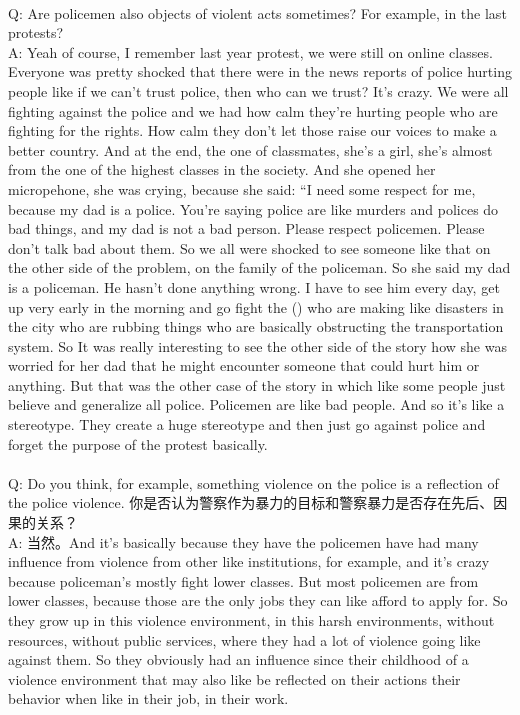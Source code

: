 \documentclass{phyasgn}\usepackage{nag}
\begin{document}
\\
Q: Are policemen also objects of violent acts sometimes? For example, in the last protests?\\
A: Yeah of course, I remember last year protest, we were still on online classes. Everyone was pretty shocked that there were in the news reports of police hurting people like if we can't trust police, then who can we trust? It's crazy. We were all fighting against the police and we had how calm they're hurting people who are fighting for the rights. How calm they don't let those raise our voices to make a better country. And at the end, the one of classmates, she’s a girl, she's almost from the one of the highest classes in the society. And she opened her micropehone, she was crying, because she said: “I need some respect for me, because my dad is a police. You're saying police are like murders and polices do bad things, and my dad is not a bad person. Please respect policemen. Please don't talk bad about them. So we all were shocked to see someone like that on the other side of the problem, on the family of the policeman. So she said my dad is a policeman. He hasn't done anything wrong. I have to see him every day, get up very early in the morning and go fight the () who are making like disasters in the city who are rubbing things who are basically obstructing the transportation system. So It was really interesting to see the other side of the story how she was worried for her dad that he might encounter someone that could hurt him or anything. But that was the other case of the story in which like some people just believe and generalize all police. Policemen are like bad people. And so it's like a stereotype. They create a huge stereotype and then just go against police and forget the purpose of the protest basically. \\
\\
Q: Do you think, for example, something violence on the police is a reflection of the police violence. 你是否认为警察作为暴力的目标和警察暴力是否存在先后、因果的关系？\\
A: 当然。And it's basically because they have the policemen have had many influence from violence from other like institutions, for example, and it's crazy because policeman's mostly fight lower classes. But most policemen are from lower classes, because those are the only jobs they can like afford to apply for. So they grow up in this violence environment, in this harsh environments, without resources, without public services, where they had a lot of violence going like against them. So they obviously had an influence since their childhood of a violence environment that may also like be reflected on their actions their behavior when like in their job, in their work.\\
\end{document}
